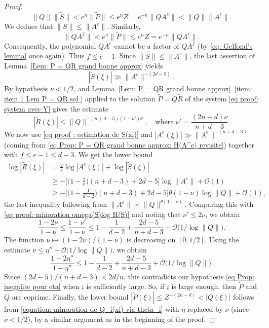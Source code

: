 \documentclass[JEP,XML,SOM,Unicode,NoFloatCountersInSection,published]{cedram}
\newcommand\tP{\widetilde{P}}
\newcommand\tR{\widetilde{R}}
\newcommand\tS{\widetilde{S}}
\newcommand\GrO{\mathcal{O}}
\newcommand{\normH}[1]{\|#1\|}
\theoremstyle{definition}
\theoremstyle{plain}
\begin{document}
\begin{proof}
\[
\normH{Q}\normH{\tS} < e^{n}\normH{\tP} \leq e^nZ = e^{-n} \normH{QA^e} < \normH{Q}\normH{A^e}.
\]
We deduce that $\normH{\tS}\leq \normH{A^e}$. Similarly,
\[
\normH{QA^f} < e^n\normH{\tP} \leq e^nZ = e^{-n} \normH{QA^e}.
\]
Consequently, the polynomial $QA^e$ cannot be a factor of $QA^f$ (by \eqref{eq: Gelfond's lemma} once again). Thus $f\leq e-1$. Since $\normH{\tS}\leq \normH{A^e}$, the last assertion of Lemma~\ref{Lem: P = QR grand bonne approx} yields
\begin{equation}
\label{eq proof : estimation de S(xi)}
|\tS(\xi)| \gg \normH{A^e}^{-(2d-5)}.
\end{equation}
By hypothesis $\nu < 1/2$, and Lemma~\ref{Lem: P = QR grand bonne approx}~\eqref{item: item 1 Lem P = QR sol } applied to the solution $\tP=Q\tR$ of the system \eqref{eq proof: system avec Y} gives the estimate
\begin{equation}
\label{eq proof: minoration omega(S)log H(S)}
|\tR(\xi)| \leq \normH{Q}^{-(n+d-3)(1-\nu')\theta}, \quad \textrm{where } \nu'= \frac{(2n-d)\nu}{n+d-3}.
\end{equation}
We now use \eqref{eq proof : estimation de S(xi)} and $|A^e(\xi)| \gg \normH{A^e}^{-(n+d-3)}$ (coming from \eqref{eq Prop: P = QR grand bonne approx: H(A^e) revisite}) together with $f\leq e-1\leq d-3$. We get the lower bound
\begin{align*}
\log|\tR(\xi)| & = \frac{f}{e}\log|A^e(\xi)|+\log|\tS(\xi)| \\
& \geq -\Big[\Big(1-\frac{1}{e} \Big)(n+d-3) + 2d-5\Big]\log \normH{A^e} + \GrO(1)\\
& \geq -\Big[\Big(1-\frac{1}{d-2} \Big)(n+d-3) + 2d-5\Big]\theta(1-\nu)\log \normH{Q} + \GrO(1),
\end{align*}
the last inequality following from $\normH{A^e} \asymp \normH{Q}^{\theta(1-\nu)}$. Comparing this with \eqref{eq proof: minoration omega(S)log H(S)} and noting that $\nu'\leq 2\nu$, we obtain
\begin{equation*}
\frac{1-2\nu}{1-\nu} \leq \frac{1-\nu'}{1-\nu} \leq 1-\frac{1}{d-2} + \frac{2d-5}{n+d-3} + \GrO\big(1/\log \normH{Q}\big).
\end{equation*}
The function $ \nu \mapsto (1-2\nu)/(1-\nu)$ is decreasing on $[0,1/2]$. Using the estimate $\nu \leq \eta'' + \GrO\big(1/\log \normH{Q}\big)$, we obtain
\begin{equation*}
\frac{1-2\eta''}{1-\eta''} \leq 1-\frac{1}{d-2} + \frac{2d-5}{n+d-3} + \GrO\big(1/\log \normH{Q}\big).
\end{equation*}
Since $(2d-5)/(n+d-3) < 2d/n$, this contradicts our hypothesis \eqref{eq Prop: inegalite pour eta} when $i$ is sufficiently large. So, if $i$ is large enough, then $\tP$ and $Q$ are coprime. Finally, the lower bound $|\tP(\xi)|\leq Z^{-(2n-d)} < |Q(\xi)|$ follows from \eqref{equation: minoration de Q_i(xi) via theta_i} with $\eta$ replaced by $\nu$ (since $\nu < 1/2$), by a similar argument as in the beginning of the proof.
\end{proof}
\end{document}

